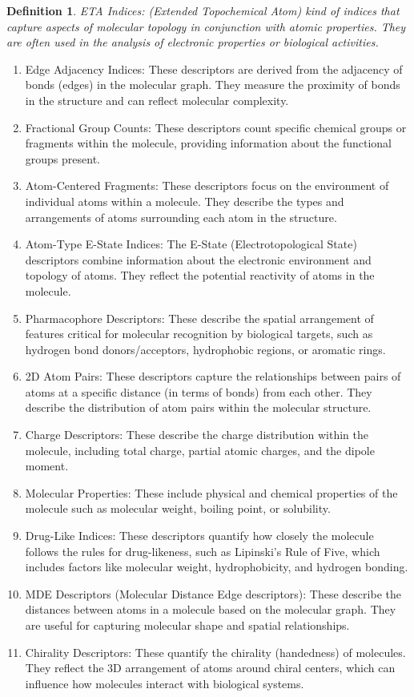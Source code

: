 \documentclass[12pt,letterpaper]{article}
\newtheorem{definition}{Definition}
\begin{document}
\begin{multicols}{2}
\begin{definition}
ETA Indices: (Extended Topochemical Atom) kind of indices that capture aspects of molecular topology in conjunction with atomic properties. They are often used in the analysis of electronic properties or biological activities.
\end{definition}

\begin{enumerate}
    \item Edge Adjacency Indices: These descriptors are derived from the adjacency of bonds (edges) in the molecular graph. They measure the proximity of bonds in the structure and can reflect molecular complexity.
    \item Fractional Group Counts: These descriptors count specific chemical groups or fragments within the molecule, providing information about the functional groups present.
    \item Atom-Centered Fragments: These descriptors focus on the environment of individual atoms within a molecule. They describe the types and arrangements of atoms surrounding each atom in the structure.
    \item Atom-Type E-State Indices: The E-State (Electrotopological State) descriptors combine information about the electronic environment and topology of atoms. They reflect the potential reactivity of atoms in the molecule.
    \item Pharmacophore Descriptors: These describe the spatial arrangement of features critical for molecular recognition by biological targets, such as hydrogen bond donors/acceptors, hydrophobic regions, or aromatic rings.
    \item 2D Atom Pairs: These descriptors capture the relationships between pairs of atoms at a specific distance (in terms of bonds) from each other. They describe the distribution of atom pairs within the molecular structure.
    \item Charge Descriptors: These describe the charge distribution within the molecule, including total charge, partial atomic charges, and the dipole moment.
    \item Molecular Properties: These include physical and chemical properties of the molecule such as molecular weight, boiling point, or solubility.
    \item Drug-Like Indices: These descriptors quantify how closely the molecule follows the rules for drug-likeness, such as Lipinski’s Rule of Five, which includes factors like molecular weight, hydrophobicity, and hydrogen bonding.
    \item MDE Descriptors (Molecular Distance Edge descriptors): These describe the distances between atoms in a molecule based on the molecular graph. They are useful for capturing molecular shape and spatial relationships.
    \item Chirality Descriptors: These quantify the chirality (handedness) of molecules. They reflect the 3D arrangement of atoms around chiral centers, which can influence how molecules interact with biological systems.
\end{enumerate}


\end{multicols}
\end{document}
